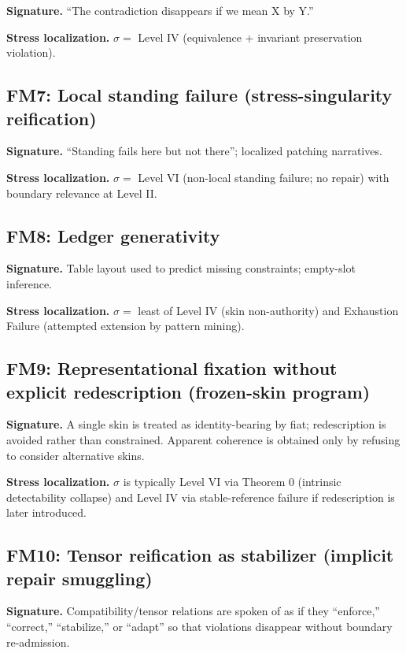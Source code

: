 \documentclass[12pt]{article}
\theoremstyle{plain}
\begin{document}
\textbf{Signature.} ``The contradiction disappears if we mean X by Y.''

\textbf{Stress localization.} $\sigma = $ Level IV (equivalence + invariant preservation violation).

\subsection{FM7: Local standing failure (stress-singularity reification)}

\textbf{Signature.} ``Standing fails here but not there''; localized patching narratives.

\textbf{Stress localization.} $\sigma = $ Level VI (non-local standing failure; no repair) with boundary relevance at Level II.

\subsection{FM8: Ledger generativity}

\textbf{Signature.} Table layout used to predict missing constraints; empty-slot inference.

\textbf{Stress localization.} $\sigma = $ least of Level IV (skin non-authority) and Exhaustion Failure (attempted extension by pattern mining).


\subsection{FM9: Representational fixation without explicit redescription (frozen-skin program)}

\textbf{Signature.} A single skin is treated as identity-bearing by fiat; redescription is avoided rather than constrained. Apparent coherence is obtained only by refusing to consider alternative skins.

\textbf{Stress localization.} $\sigma$ is typically Level VI via Theorem 0 (intrinsic detectability collapse) and Level IV via stable-reference failure if redescription is later introduced.

\subsection{FM10: Tensor reification as stabilizer (implicit repair smuggling)}

\textbf{Signature.} Compatibility/tensor relations are spoken of as if they ``enforce,'' ``correct,'' ``stabilize,'' or ``adapt'' so that violations disappear without boundary re-admission.
\end{document}

